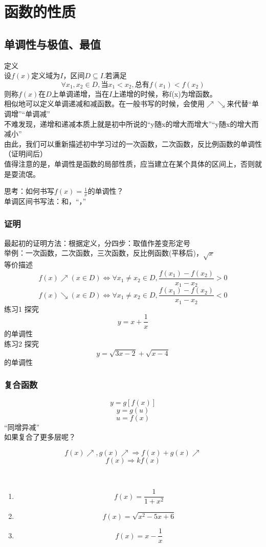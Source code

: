 \section{函数的性质}
\subsection{单调性与极值、最值}
定义
\\设$f(x)$定义域为$I$，区间$D\subseteq I$.若满足
\[\forall x_1,x_2 \in D,\text{当}x_1<x_2,\text{总有}f(x_1)<f(x_2)\]
则称$f(x)$在$D$上单调递增，当在$I$上递增的时候，称f(x)为增函数。
\\相似地可以定义单调递减和减函数。在一般书写的时候，会使用$\nearrow \searrow $来代替“单调增”“单调减”
\\不难发现，递增和递减本质上就是初中所说的“y随x的增大而增大”“y随x的增大而减小”
\\由此，我们可以重新描述初中学习过的一次函数，二次函数，反比例函数的单调性（证明间后）
\\值得注意的是，单调性是函数的局部性质，应当建立在某个具体的区间上，否则就是耍流氓。

思考：如何书写$f(x)=\frac{1}{x}$的单调性？
\\单调区间书写法：和，“，”
\subsubsection*{证明}
最起初的证明方法：根据定义，分四步：取值作差变形定号
\\举例：一次函数，二次函数，三次函数，反比例函数(平移后)，$\sqrt{x}$
\\等价描述
\[f(x)\nearrow (x\in D)\Leftrightarrow \forall x_1\neq x_2\in D,\frac{f(x_1)-f(x_2)}{x_1-x_2}>0\]
\[f(x)\searrow (x\in D)\Leftrightarrow \forall x_1\neq x_2\in D,\frac{f(x_1)-f(x_2)}{x_1-x_2}<0\]
练习1 探究\[y=x+\frac{1}{x}\]的单调性
\\练习2 探究\[y=\sqrt{3x-2}+\sqrt{x-4}\]的单调性
\subsubsection*{复合函数}
\[y=g[f(x)]\]
\[y=g(u)\]
\[u=f(x)\]
“同增异减”
\\如果复合了更多层呢？

\[f(x)\nearrow ,g(x)\nearrow \Rightarrow f(x)+g(x)\nearrow \]
\[f(x) \Rightarrow kf(x)\]

\begin{exercise}
    \ 

    \begin{enumerate}
        \item \[f(x)=\frac{1}{1+x^2}\]
        \item \[f(x)=\sqrt{x^2-5x+6}\]
        \item \[f(x)=x-\frac{1}{x}\]
    \end{enumerate}
\end{exercise}



